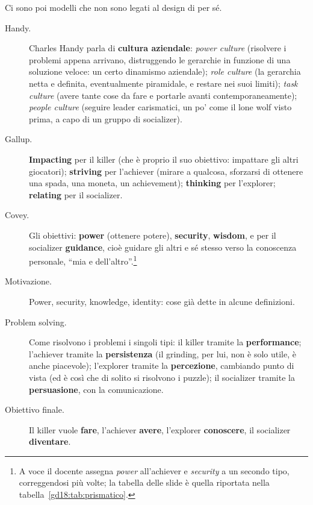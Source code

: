 Ci sono poi modelli che non sono legati al design di per sé.
\begin{description}
  \item[Handy.] Charles Handy parla di \textbf{cultura aziendale}: \emph{power
        culture} (risolvere i problemi appena arrivano, distruggendo le gerarchie in
        funzione di una soluzione veloce: un certo dinamismo aziendale); \emph{role
        culture} (la gerarchia netta e definita, eventualmente piramidale, e restare
        nei suoi limiti); \emph{task culture} (avere tante cose da fare e portarle
        avanti contemporaneamente); \emph{people culture} (seguire leader
        carismatici, un po' come il lone wolf visto prima, a capo di un gruppo di
        socializer).
  \item[Gallup.] \textbf{Impacting} per il killer (che è proprio il suo obiettivo:
        impattare gli altri giocatori); \textbf{striving} per l'achiever (mirare a
        qualcosa, sforzarsi di ottenere una spada, una moneta, un achievement);
        \textbf{thinking} per l'explorer; \textbf{relating} per il socializer.
  \item[Covey.] Gli obiettivi: \textbf{power} (ottenere potere), \textbf{security},
        \textbf{wisdom}, e per il socializer \textbf{guidance}, cioè guidare gli altri
        e sé stesso verso la conoscenza personale, ``mia e dell'altro''.\footnote{A
        voce il docente assegna \emph{power} all'achiever e \emph{security} a un
        secondo tipo, correggendosi più volte; la tabella delle slide è quella
        riportata nella tabella~\ref{gd18:tab:prismatico}.}
  \item[Motivazione.] Power, security, knowledge, identity: cose già dette in alcune
        definizioni.
  \item[Problem solving.] Come risolvono i problemi i singoli tipi: il killer
        tramite la \textbf{performance}; l'achiever tramite la \textbf{persistenza}
        (il grinding, per lui, non è solo utile, è anche piacevole); l'explorer
        tramite la \textbf{percezione}, cambiando punto di vista (ed è così che di
        solito si risolvono i puzzle); il socializer tramite la
        \textbf{persuasione}, con la comunicazione.
  \item[Obiettivo finale.] Il killer vuole \textbf{fare}, l'achiever \textbf{avere},
        l'explorer \textbf{conoscere}, il socializer \textbf{diventare}.
\end{description}

